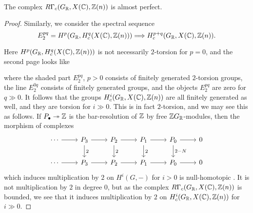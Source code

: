\documentclass{article}
\numberwithin{equation}{section}
\begin{document}
\begin{lemma}
  \label{lemma:RGammac(GR,X(C),Z(n))-almost-perfect}
  The complex $R\Gamma_c (G_{\mathbb{R}}, X (\mathbb{C}), \mathbb{Z} (n))$
  is almost perfect.

  \begin{proof}
    Similarly, we consider the spectral sequence
    \[ E_2^{pq} = H^p (G_{\mathbb{R}}, H^q_c (X (\mathbb{C}), \mathbb{Z} (n)))
    \Longrightarrow
    H^{p+q}_c (G_{\mathbb{R}}, X (\mathbb{C}), \mathbb{Z} (n)). \]

    Here $H^p (G_{\mathbb{R}}, H^q_c (X (\mathbb{C}), \mathbb{Z} (n)))$ is not necessarily $2$-torsion
    for $p = 0$, and the second page looks like
    \begin{center}
    \end{center}
    where the shaded part $E_2^{pq}$, $p > 0$ consists of finitely generated
    $2$-torsion groups, the line $E_2^{0q}$ consists of finitely generated
    groups, and the objects $E_2^{pq}$ are zero for $q \gg 0$. It follows that
    the groups $H^i_c (G_{\mathbb{R}}, X (\mathbb{C}), \mathbb{Z} (n))$ are all finitely generated as
    well, and they are torsion for $i \gg 0$. This is in fact $2$-torsion, and
    we may see this as follows. If $P_\bullet \twoheadrightarrow \mathbb{Z}$ is the
    bar-resolution of $\mathbb{Z}$ by free $\mathbb{Z} G_{\mathbb{R}}$-modules, then the morphism of
    complexes
    \[ \begin{tikzcd}
      \cdots\ar{r} & P_3\ar{r}\ar{d}{2} & P_2\ar{r}\ar{d}{2} & P_1\ar{r}\ar{d}{2} & P_0\ar{r}\ar{d}{2-N} & 0 \\
      \cdots\ar{r} & P_3\ar{r} & P_2\ar{r} & P_1\ar{r} & P_0\ar{r} & 0
    \end{tikzcd} \]
    which induces multiplication by $2$ on $H^i (G,-)$ for $i > 0$
    is null-homotopic \cite[Theorem~6.5.8]{Weibel-1994}. It is not
    multiplication by $2$ in degree $0$, but as the complex
    $R\Gamma_c (G_{\mathbb{R}}, X (\mathbb{C}), \mathbb{Z} (n))$ is bounded, we see that it induces
    multiplication by $2$ on $H^i_c (G_{\mathbb{R}}, X (\mathbb{C}), \mathbb{Z} (n))$ for $i \gg 0$.
  \end{proof}
\end{lemma}
\end{document}
